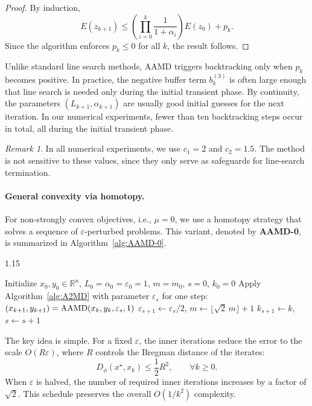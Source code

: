 \documentclass{article}
\theoremstyle{plain}
\theoremstyle{definition}
\theoremstyle{remark}
\newtheorem{remark}[theorem]{Remark}
\begin{document}
\begin{proof}
By induction,
$$
E(z_{k+1})
\le
\left(\prod_{i=0}^k\frac{1}{1+\alpha_i}\right)E(z_0)
+
p_k.
$$
Since the algorithm enforces $p_k\le 0$ for all $k$, the result follows.
\end{proof}

Unlike standard line search methods, AAMD triggers backtracking only when $p_k$ becomes positive. In practice, the negative buffer term $b_k^{(3)}$ is often large enough that line search is needed only during the initial transient phase. By continuity, the parameters $(L_{k+1},\alpha_{k+1})$ are usually good initial guesses for the next iteration. In our numerical experiments, fewer than ten backtracking steps occur in total, all during the initial transient phase.

\begin{remark}
In all numerical experiments, we use $c_1=2$ and $c_2=1.5$. The method is not sensitive to these values, since they only serve as safeguards for line-search termination.
\end{remark}

\paragraph{General convexity via homotopy.}
For non-strongly convex objectives, i.e., $\mu=0$, we use a homotopy strategy that solves a sequence of $\varepsilon$-perturbed problems. This variant, denoted by \textbf{AAMD-0}, is summarized in Algorithm~\ref{alg:AAMD-0}.

\begin{algorithm}[t]
\caption{AAMD-0}\label{alg:AAMD-0}
\begin{spacing}{1.15}
\begin{algorithmic}[1]
\STATE Initialize $x_0,y_0\in\mathbb R^n$, $L_0=\alpha_0=\varepsilon_0=1$, $m=m_0$, $s=0$, $k_0=0$
\STATE Apply Algorithm~\ref{alg:A2MD} with parameter $\varepsilon_s$ for one step:
$(x_{k+1},y_{k+1})={\rm AAMD}(x_k,y_k,\varepsilon_s,1)$
\STATE $\varepsilon_{s+1}\gets \varepsilon_s/2$, \quad $m\gets \lfloor\sqrt{2}\,m\rfloor+1$
\STATE $k_{s+1}\gets k$, \quad $s\gets s+1$
\ENDIF
\ENDFOR
\end{algorithmic}
\end{spacing}
\end{algorithm}

The key idea is simple. For a fixed $\varepsilon$, the inner iterations reduce the error to the scale $O(R\varepsilon)$, where $R$ controls the Bregman distance of the iterates:
\begin{equation}\label{eq:boundedness}
D_\phi(x^\star,x_k)\le \frac12 R^2,\qquad \forall k\ge 0.
\end{equation}
When $\varepsilon$ is halved, the number of required inner iterations increases by a factor of $\sqrt{2}$. This schedule preserves the overall $O(1/k^2)$ complexity. 
\end{document}

